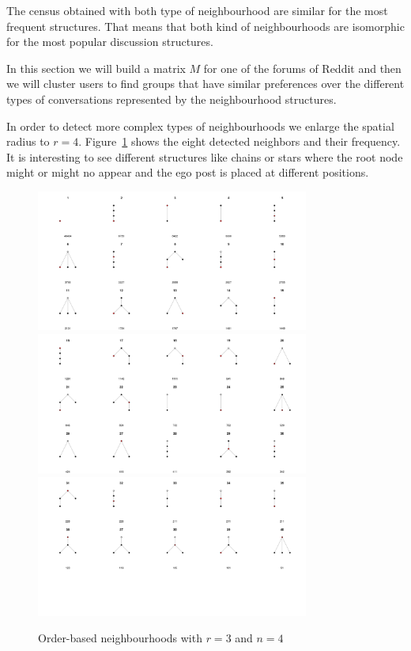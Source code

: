 \documentclass[conference]{IEEEtran}
\begin{document}
The census obtained with both type of neighbourhood are similar for the most frequent structures. That means that both kind of neighbourhoods are isomorphic for the most popular discussion structures.



In this section we will build a matrix $M$ for one of the forums of Reddit and then we will cluster users to find groups that have similar preferences over the different types of conversations represented by the neighbourhood structures. 

In order to detect more complex types of neighbourhoods we enlarge the spatial radius to $r=4$. Figure~\ref{fig:neighbourhoods_4_4} shows the eight detected neighbors and their frequency. It is interesting to see different structures like chains or stars where the root node might or might no appear and the ego post is placed at different positions.


\begin{figure}
	\centering
	\includegraphics[width=0.8\textwidth]{neighbourhoods_3_4_1}
	\includegraphics[width=0.8\textwidth]{neighbourhoods_3_4_2}
	\includegraphics[width=0.8\textwidth]{neighbourhoods_3_4_3}
	\caption{Order-based neighbourhoods with $r=3$ and $n=4$}
	\label{fig:neighbourhoods_4_4}
\end{figure}
\end{document}
